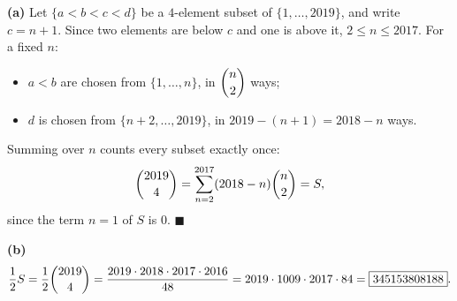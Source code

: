 \textbf{(a)} Let $\{a<b<c<d\}$ be a $4$-element subset of $\{1,\dots,2019\}$, and write $c=n+1$. Since two elements are below $c$ and one is above it, $2\le n\le2017$. For a fixed $n$:
\begin{itemize}
\item $a<b$ are chosen from $\{1,\dots,n\}$, in $\dbinom n2$ ways;
\item $d$ is chosen from $\{n+2,\dots,2019\}$, in $2019-(n+1)=2018-n$ ways.
\end{itemize}
Summing over $n$ counts every subset exactly once:
\[\dbinom{2019}{4}=\sum_{n=2}^{2017}(2018-n)\dbinom n2=S,\]
since the term $n=1$ of $S$ is $0$. $\blacksquare$

\textbf{(b)}
\[\dfrac12S=\dfrac12\dbinom{2019}{4}=\dfrac{2019\cdot2018\cdot2017\cdot2016}{48}=2019\cdot1009\cdot2017\cdot84=\boxed{345153808188}.\]
